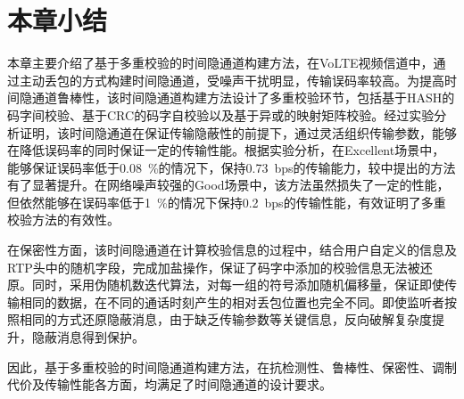 \section{本章小结}
\label{chap:hash:summary}

本章主要介绍了基于多重校验的时间隐通道构建方法，在VoLTE视频信道中，通过主动丢包的方式构建时间隐通道，受噪声干扰明显，传输误码率较高。为提高时间隐通道鲁棒性，该时间隐通道构建方法设计了多重校验环节，包括基于HASH的码字间校验、基于CRC的码字自校验以及基于异或的映射矩阵校验。经过实验分析证明，该时间隐通道在保证传输隐蔽性的前提下，通过灵活组织传输参数，能够在降低误码率的同时保证一定的传输性能。根据实验分析，在Excellent场景中，能够保证误码率低于0.08\ \%的情况下，保持0.73\ bps的传输能力，较中提出的方法有了显著提升。在网络噪声较强的Good场景中，该方法虽然损失了一定的性能，但依然能够在误码率低于1\ \%的情况下保持0.2\ bps的传输性能，有效证明了多重校验方法的有效性。

在保密性方面，该时间隐通道在计算校验信息的过程中，结合用户自定义的信息及RTP头中的随机字段，完成加盐操作，保证了码字中添加的校验信息无法被还原。同时，采用伪随机数迭代算法，对每一组的符号添加随机偏移量，保证即使传输相同的数据，在不同的通话时刻产生的相对丢包位置也完全不同。即使监听者按照相同的方式还原隐蔽消息，由于缺乏传输参数等关键信息，反向破解复杂度提升，隐蔽消息得到保护。

因此，基于多重校验的时间隐通道构建方法，在抗检测性、鲁棒性、保密性、调制代价及传输性能各方面，均满足了时间隐通道的设计要求。
